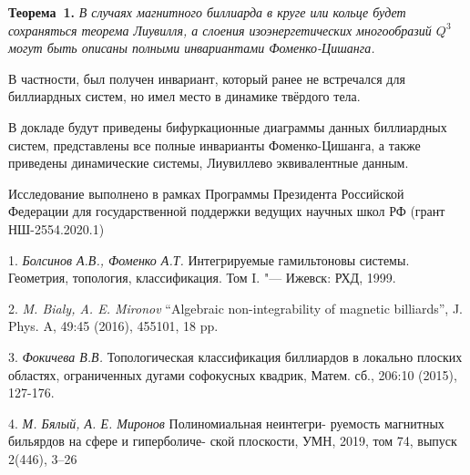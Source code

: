 	\textbf{Теорема~1.} {\it В случаях магнитного биллиарда в круге или кольце будет сохраняться теорема Лиувилля, а слоения изоэнергетических многообразий $Q^3$ могут быть описаны полными инвариантами Фоменко-Цишанга.}

	В частности, был получен инвариант, который ранее не встречался для биллиардных систем, но имел место в динамике твёрдого тела.

	В докладе будут приведены бифуркационные диаграммы данных биллиардных систем, представлены все полные инварианты Фоменко-Цишанга, а также приведены динамические системы, Лиувиллево эквивалентные данным.

	Исследование выполнено в рамках Программы Президента Российской Федерации для государственной поддержки ведущих научных школ РФ (грант НШ-2554.2020.1)

\litlist

	1. {\it Болсинов А.В., Фоменко А.Т.} Интегрируемые гамильтоновы системы. Геометрия, топология, классификация. Том I.
	"--- Ижевск: РХД, 1999.

	2. {\it M. Bialy, A. E. Mironov} “Algebraic non-integrability of magnetic billiards”,
	J. Phys. A, 49:45 (2016), 455101, 18 pp.

	3. {\it Фокичева В.В.} Топологическая классификация биллиардов в локально плоских областях, ограниченных дугами софокусных квадрик, Матем. сб., 206:10 (2015), 127-176.

	4. {\it М. Бялый, А. Е. Миронов} Полиномиальная неинтегри-
	руемость магнитных бильярдов на сфере и гиперболиче-
	ской плоскости, УМН, 2019, том 74, выпуск 2(446), 3–26

